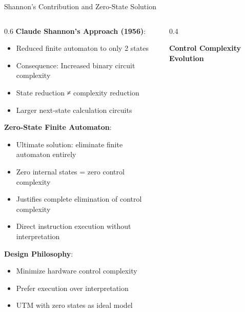 \documentclass[aspectratio=169]{beamer}
\newcommand{\concept}[1]{\textbf{\color{darkblue}#1}}
\begin{document}
\begin{frame}{Shannon's Contribution and Zero-State Solution}
\begin{columns}
\begin{column}{0.6\textwidth}
\concept{Claude Shannon's Approach (1956)}:
\begin{itemize}
\item Reduced finite automaton to only 2 states
\item Consequence: Increased binary circuit complexity
\item State reduction ≠ complexity reduction
\item Larger next-state calculation circuits
\end{itemize}

\vspace{0.3cm}
\concept{Zero-State Finite Automaton}:
\begin{itemize}
\item Ultimate solution: eliminate finite automaton entirely
\item Zero internal states = zero control complexity
\item Justifies complete elimination of control complexity
\item Direct instruction execution without interpretation
\end{itemize}

\vspace{0.3cm}
\concept{Design Philosophy}:
\begin{itemize}
\item Minimize hardware control complexity
\item Prefer execution over interpretation
\item UTM with zero states as ideal model
\end{itemize}
\end{column}
\begin{column}{0.4\textwidth}
\begin{center}
\textbf{Control Complexity Evolution}
\vspace{0.3cm}

\end{center}
\end{column}
\end{columns}
\end{frame}
\end{document}
